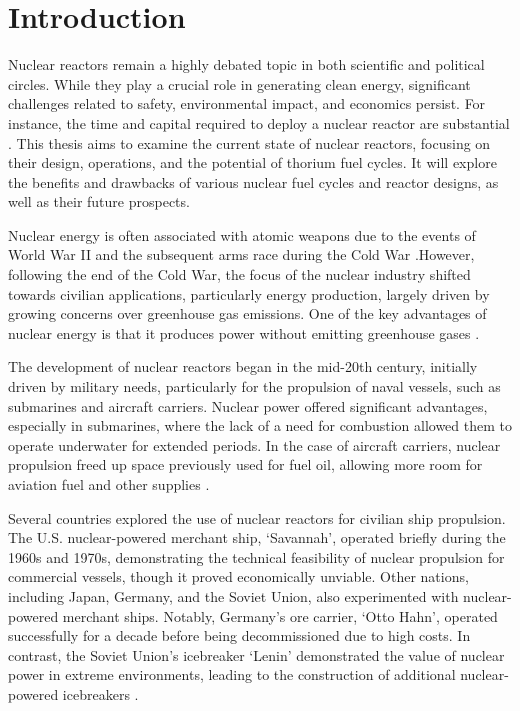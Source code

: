 \chapter{Introduction}

Nuclear reactors remain a highly debated topic in both scientific and political circles. While they play a crucial role in generating clean energy, significant challenges related to safety, environmental impact, and economics persist. For instance, the time and capital required to deploy a nuclear reactor are substantial \cite{Kornecki_Wise_2024}. This thesis aims to examine the current state of nuclear reactors, focusing on their design, operations, and the potential of thorium fuel cycles. It will explore the benefits and drawbacks of various nuclear fuel cycles and reactor designs, as well as their future prospects.

Nuclear energy is often associated with atomic weapons due to the events of World War II and the subsequent arms race during the Cold War \cite{Lamarsh_Baratta_2009}.However, following the end of the Cold War, the focus of the nuclear industry shifted towards civilian applications, particularly energy production, largely driven by growing concerns over greenhouse gas emissions. One of the key advantages of nuclear energy is that it produces power without emitting greenhouse gases \cite{Lamarsh_Baratta_2009}.

The development of nuclear reactors began in the mid-20th century, initially driven by military needs, particularly for the propulsion of naval vessels, such as submarines and aircraft carriers. Nuclear power offered significant advantages, especially in submarines, where the lack of a need for combustion allowed them to operate underwater for extended periods. In the case of aircraft carriers, nuclear propulsion freed up space previously used for fuel oil, allowing more room for aviation fuel and other supplies \cite{Lamarsh_Baratta_2009}.

Several countries explored the use of nuclear reactors for civilian ship propulsion. The U.S. nuclear-powered merchant ship, `Savannah', operated briefly during the 1960s and 1970s, demonstrating the technical feasibility of nuclear propulsion for commercial vessels, though it proved economically unviable. Other nations, including Japan, Germany, and the Soviet Union, also experimented with nuclear-powered merchant ships. Notably, Germany's ore carrier, `Otto Hahn', operated successfully for a decade before being decommissioned due to high costs. In contrast, the Soviet Union's icebreaker `Lenin' demonstrated the value of nuclear power in extreme environments, leading to the construction of additional nuclear-powered icebreakers \cite{Lamarsh_Baratta_2009}.

